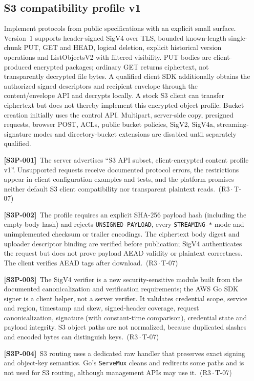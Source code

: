 \documentclass[11pt,a4paper]{article}
\newcommand{\code}[1]{{\small\nolinkurl{#1}}}
\newcommand{\reqtag}[2]{{\footnotesize\color{accent}(#1\,$\cdot$\,#2)}}
\newcommand{\req}[4]{\par\noindent\hypertarget{req:#1}{\textbf{[#1]}}\ #4\ \reqtag{#2}{#3}\par}
\begin{document}
\subsection{S3 compatibility profile v1}\label{sec:s3}
Implement protocols from public specifications with an explicit small surface. Version~1 supports header-signed SigV4 over TLS, bounded known-length single-chunk PUT, GET and HEAD, logical deletion, explicit historical version operations and ListObjectsV2 with filtered visibility. PUT bodies are client-produced encrypted packages; ordinary GET returns ciphertext, not transparently decrypted file bytes. A qualified client SDK additionally obtains the authorized signed descriptors and recipient envelope through the content/envelope API and decrypts locally. A stock S3 client can transfer ciphertext but does not thereby implement this encrypted-object profile. Bucket creation initially uses the control API. Multipart, server-side copy, presigned requests, browser POST, ACLs, public bucket policies, SigV2, SigV4a, streaming-signature modes and directory-bucket extensions are disabled until separately qualified.
\req{S3P-001}{R3}{T-07}{The server advertises ``S3 API subset, client-encrypted content profile v1''. Unsupported requests receive documented protocol errors, the restrictions appear in client configuration examples and tests, and the platform promises neither default S3 client compatibility nor transparent plaintext reads.}
\req{S3P-002}{R3}{T-07}{The profile requires an explicit SHA-256 payload hash (including the empty-body hash) and rejects \code{UNSIGNED-PAYLOAD}, every \code{STREAMING-*} mode and unimplemented checksum or trailer encodings. The ciphertext body digest and uploader descriptor binding are verified before publication; SigV4 authenticates the request but does not prove payload AEAD validity or plaintext correctness. The client verifies AEAD tags after download.}
\req{S3P-003}{R3}{T-07}{The SigV4 verifier is a new security-sensitive module built from the documented canonicalization and verification requirements; the AWS Go SDK signer is a client helper, not a server verifier. It validates credential scope, service and region, timestamp and skew, signed-header coverage, request canonicalization, signature (with constant-time comparison), credential state and payload integrity. S3 object paths are not normalized, because duplicated slashes and encoded bytes can distinguish keys.}
\req{S3P-004}{R3}{T-07}{S3 routing uses a dedicated raw handler that preserves exact signing and object-key semantics. Go's \code{ServeMux} cleans and redirects some paths and is not used for S3 routing, although management APIs may use it.}
\end{document}
